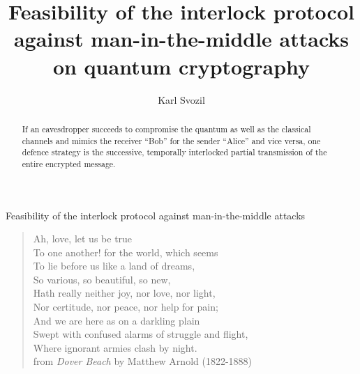 \documentclass{ws-ijqi}
\begin{document}
{Feasibility of the interlock protocol against man-in-the-middle attacks}

%
\catchline{}{}{}{}{}
%


\title{Feasibility of the interlock protocol against man-in-the-middle attacks on quantum cryptography}

\author{Karl Svozil}
\address{Institut f\"ur Theoretische Physik, University of Technology Vienna, \\
Wiedner Hauptstra\ss e 8-10/136, A-1040 Vienna, Austria                         \\
svozil@tuwien.ac.at}

\maketitle

\begin{abstract}
If an eavesdropper succeeds to compromise the quantum as well as the classical channels
and mimics the receiver ``Bob''  for the sender ``Alice'' and vice versa,
one defence strategy is the successive,
temporally interlocked partial transmission of the entire encrypted message.
\end{abstract}





\begin{quote}
\begin{flushright}
{\tiny
Ah, love, let us be true                                 \\
To one another! for the world, which seems                \\
To lie before us like a land of dreams,                  \\
So various, so beautiful, so new,                        \\
Hath really neither joy, nor love, nor light,            \\
Nor certitude, nor peace, nor help for pain;             \\
And we are here as on a darkling plain                   \\
Swept with confused alarms of struggle and flight,       \\
Where ignorant armies clash by night.                    \\
from {\it Dover Beach} by Matthew Arnold (1822-1888) }
\end{flushright}
\end{quote}
\end{document}

